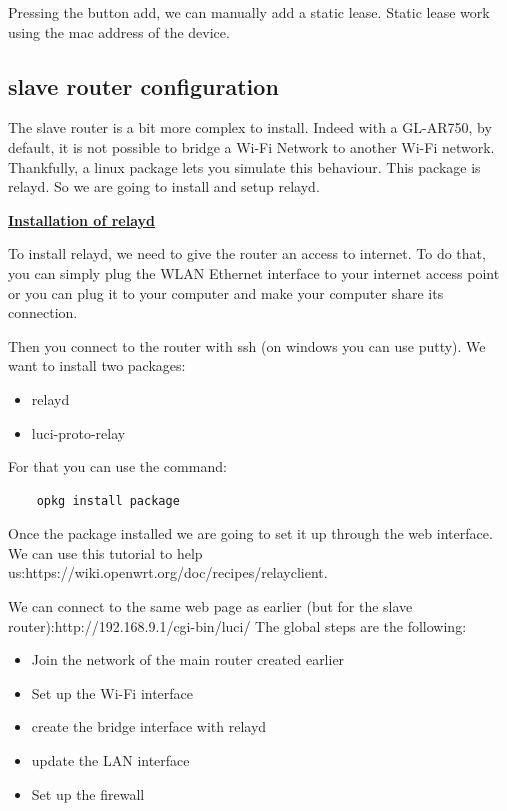 Pressing the button add, we can manually add a static lease. Static lease work using the mac address of the device. 

\subsection{slave router configuration}

The slave router is a bit more complex to install. Indeed with a GL-AR750, by default, it is not possible to bridge a Wi-Fi Network to another Wi-Fi network. Thankfully, a linux package lets you simulate this behaviour. This package is relayd.
So we are going to install and setup relayd.

\hfill \break \underline{\large{\textbf{Installation of relayd}}}

To install relayd, we need to give the router an access to internet. To do that, you can simply plug the WLAN Ethernet interface to your internet access point or you can plug it to your computer and make your computer share its connection.

Then you connect to the router with ssh (on windows you can use putty).
We want to install two packages:
\begin{itemize}
	\item relayd
	\item luci-proto-relay
\end{itemize}

For that you can use the command:
\begin{lstlisting}
	opkg install package
\end{lstlisting}

Once the package installed we are going to set it up through the web interface. We can use this tutorial to help us:https://wiki.openwrt.org/doc/recipes/relayclient.

We can connect to the same web page as earlier (but for the slave router):http://192.168.9.1/cgi-bin/luci/
The global steps are the following:
\begin{itemize}
	\item Join the network of the main router created earlier
	\item Set up the Wi-Fi interface
	\item create the bridge interface with relayd
	\item update the LAN interface
	\item Set up the firewall
\end{itemize}

